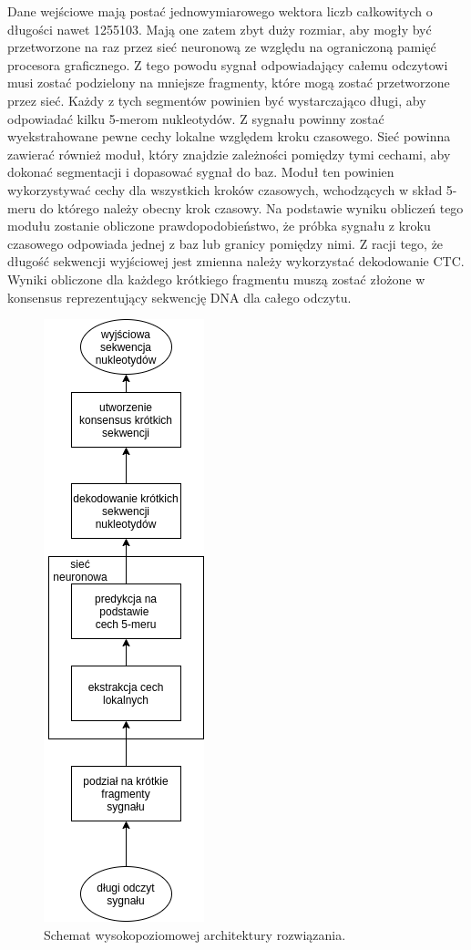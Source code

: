 \documentclass[a4paper,11pt,twoside]{report}
\theoremstyle{definition}
\begin{document}
Dane wejściowe mają postać jednowymiarowego wektora liczb całkowitych o długości nawet 1255103. Mają one zatem zbyt duży rozmiar, aby mogły być przetworzone na raz przez sieć neuronową ze względu na ograniczoną pamięć procesora graficznego. Z tego powodu sygnał odpowiadający całemu odczytowi musi zostać podzielony na mniejsze fragmenty, które mogą zostać przetworzone przez sieć. Każdy z tych segmentów powinien być wystarczająco długi, aby odpowiadać kilku 5-merom nukleotydów. Z sygnału powinny zostać wyekstrahowane pewne cechy lokalne względem kroku czasowego. Sieć powinna zawierać również moduł, który znajdzie zależności pomiędzy tymi cechami, aby dokonać segmentacji i dopasować sygnał do baz. Moduł ten powinien wykorzystywać cechy dla wszystkich kroków czasowych, wchodzących w skład 5-meru do którego należy obecny krok czasowy. Na podstawie wyniku obliczeń tego modułu zostanie obliczone prawdopodobieństwo, że próbka sygnału z kroku czasowego odpowiada jednej z baz lub granicy pomiędzy nimi. Z racji tego, że długość sekwencji wyjściowej jest zmienna należy wykorzystać dekodowanie CTC\cite{ctc}. Wyniki obliczone dla każdego krótkiego fragmentu muszą zostać złożone w konsensus reprezentujący sekwencję DNA dla całego odczytu.

\begin{figure}[h!]
	\centering
	\includegraphics[scale=0.5]{architecture}
	\caption{Schemat wysokopoziomowej architektury rozwiązania.}
\end{figure}
\end{document}
